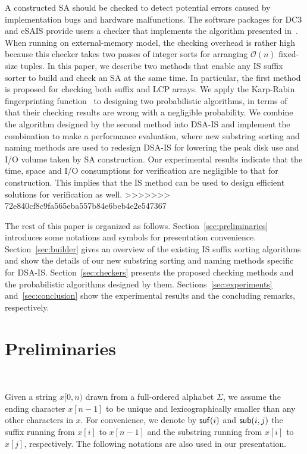 \documentclass[10pt,journal,compsoc]{IEEEtran}
\begin{document}
A constructed SA should be checked to detect potential errors caused by implementation bugs and hardware malfunctions. The software packages for DC3 and eSAIS provide users a checker that implements the algorithm presented in~\cite{Dementiev2008a}. When running on external-memory model, the checking overhead is rather high because this checker takes two passes of integer sorts for arranging $\mathcal{O}(n)$ fixed-size tuples. In this paper, we describe two methods that enable any IS suffix sorter to build and check an SA at the same time. In particular, the first method is proposed for checking both suffix and LCP arrays. We apply the Karp-Rabin fingerprinting function~\cite{Karp1987} to designing two probabilistic algorithms, in terms of that their checking results are wrong with a negligible probability. We combine the algorithm designed by the second method into DSA-IS and implement the combination to make a performance evaluation, where new substring sorting and naming methods are used to redesign DSA-IS for lowering the peak disk use and I/O volume taken by SA construction. Our experimental results indicate that the time, space and I/O consumptions for verification are negligible to that for construction. This implies that the IS method can be used to design efficient solutions for verification as well.
>>>>>>> 72e840cf8c9fa565eba557b84e6beb4e2e547367

The rest of this paper is organized as follows. Section~\ref{sec:preliminaries} introduces some notations and symbols for presentation convenience. Section~\ref{sec:builder} gives an overview of the existing IS suffix sorting algorithms and show the details of our new substring sorting and naming methods specific for DSA-IS. Section~\ref{sec:checkers} presents the proposed checking methods and the probabilistic algorithms designed by them. Sections~\ref{sec:experiments} and~\ref{sec:conclusion} show the experimental results and the concluding remarks, respectively.

\section{Preliminaries}~\label{sec:preliminaries}

Given a string $x[0,n)$ drawn from a full-ordered alphabet $\Sigma$, we assume the ending character $x[n - 1]$ to be unique and lexicographically smaller than any other characters in $x$. For convenience, we denote by ${\sf suf}(i)$ and ${\sf sub}(i, j)$ the suffix running from $x[i]$ to $x[n-  1]$ and the substring running from $x[i]$ to $x[j]$, respectively. The following notations are also used in our presentation.
\end{document}
